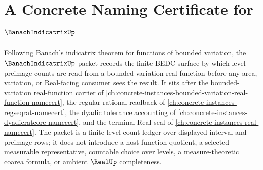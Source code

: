 \chapter{A Concrete Naming Certificate for $\BanachIndicatrixUp$}
\label{ch:concrete-instances-banach-indicatrix-namecert}

Following Banach's indicatrix theorem for functions of bounded variation, the $\BanachIndicatrixUp$ packet records the finite BEDC surface by which level preimage counts are read from a bounded-variation real function before any area, variation, or Real-facing consumer sees the result. It sits after the bounded-variation real-function carrier of \autoref{ch:concrete-instances-bounded-variation-real-function-namecert}, the regular rational readback of \autoref{ch:concrete-instances-regseqrat-namecert}, the dyadic tolerance accounting of \autoref{ch:concrete-instances-dyadicratcore-namecert}, and the terminal Real seal of \autoref{ch:concrete-instances-real-namecert}. The packet is a finite level-count ledger over displayed interval and preimage rows; it does not introduce a host function quotient, a selected measurable representative, countable choice over levels, a measure-theoretic coarea formula, or ambient $\RealUp$ completeness.

